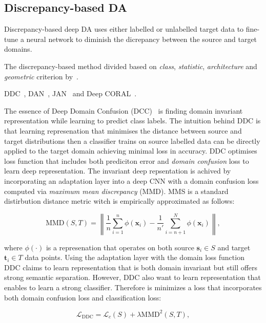 \subsection{Discrepancy-based DA}

Discrepancy-based deep DA uses either labelled or unlabelled target data
to fine-tune a neural network to diminish the dicrepancy
between the source and target domains.

The discrepancy-based method divided based on
\textit{class}, \textit{statistic}, \textit{architecture} and \textit{geometric}
criterion by~\cite{wang2018}.

DDC~\cite{tzeng2014}, DAN~\cite{long2015}, JAN~\cite{long2017}
and Deep CORAL~\cite{sun2016}.

The essence of Deep Domain Confusion (DCC)~\cite{tzeng2014} is finding domain invariant representation
while learning to predict class labels.
The intuition behind DDC is that learning represenation
that minimises the distance between source and target distributions
then a classifier trains on source labelled data
can be directly applied to the target domain achieving minimal loss in accuracy.
DDC optimises loss function that includes both prediciton error and \textit{domain confusion} loss to learn deep representation.
The invariant deep repsentation is achived by incorporating an adaptation layer
into a deep CNN with a domain confusion loss computed via \textit{maximum mean discrepancy} (MMD).
MMS is a standard distirbution distance metric
witch is empirically approximated as follows:

\begin{equation}
	\mathrm{MMD}(S, T) = \left\|
	\frac{1}{n} \sum_{i = 1}^{n} \phi(\mathbf{x}_i) -
	\frac{1}{n'} \sum_{i = n + 1}^{N} \phi(\mathbf{x}_i)
	\right\|,
	\label{maximam_mean_discrepancy}
\end{equation}

where \(\phi(\cdot)\) is a represenation
that operates on both source \(\mathbf{s}_i \in S\) and target \(\mathbf{t}_i \in T\) data points.
Using the adaptation layer with the domain loss function DDC claims
to learn representation that is both domain invariant
but still offers strong semantic separation.
However, DDC also want to learn representation
that enables to learn a strong classifier.
Therefore is minimizes a loss that incorporates both domain confusion loss and classification loss:

\begin{equation}
	\mathcal{L}_{\mathrm{DDC}} = \mathcal{L}_c(S)
	+ \lambda \mathrm{MMD}^2(S, T),
\end{equation}

